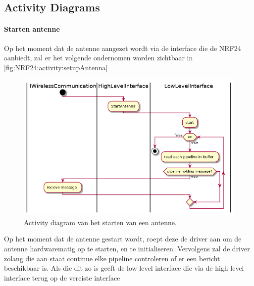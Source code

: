 \documentclass[a4paper, 11pt, oneside]{report}
\begin{document}
\subsection{Activity Diagrams}
\label{DetailedDesign:NRF24:activity}

\paragraph{Starten antenne}
\label{DetailedDesign:NRF24:activity:setupAntenna}
Op het moment dat de antenne aangezet wordt via de interface die de NRF24 aanbiedt, zal er het volgende ondernomen worden zichtbaar in \autoref{fig:NRF24:activity:setupAntenna}
\begin{figure}[H]
	\begin{center}\includegraphics[width=.9\linewidth]{UML/out/NRF24/activity/setupAntenna/setupAntenna.png}\end{center}
	\caption{Activity diagram van het starten van een antenne.}
	\label{fig:NRF24:activity:setupAntenna}
\end{figure}
Op het moment dat de antenne gestart wordt, roept deze de driver aan om de antenne hardwarematig op te starten, en te initialiseren.
Vervolgens zal de driver zolang die aan staat continue elke pipeline controleren of er een bericht beschikbaar is. 
Als die dit zo is geeft de low level interface die via de high level interface terug op de vereiste interface  
\end{document}

